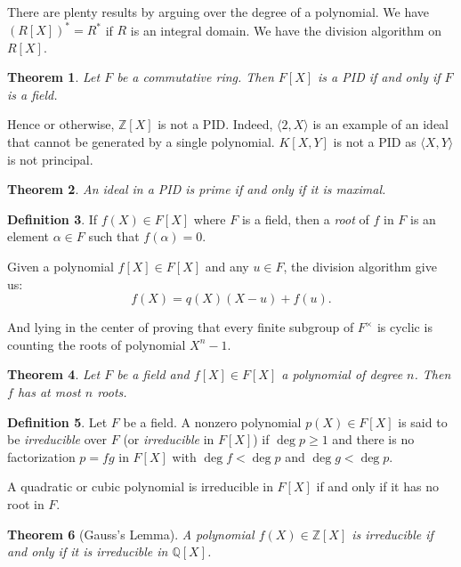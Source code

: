 \documentclass[12pt]{report}
\newtheorem{theorem}{Theorem}[section]
\theoremstyle{definition}
\newtheorem{definition}[theorem]{Definition}
\newcommand{\ZZ}{\mathbb{Z}}
\newcommand{\QQ}{\mathbb{Q}}
\begin{document}
There are plenty results by arguing over the degree of a polynomial. We have $(R[X])^* =  R^*$ if $R$ is an integral domain. We have the division algorithm on $R[X]$.

\begin{theorem}
	Let $F$ be a commutative ring. Then $F[X]$ is a PID if and only if $F$ is a field.
\end{theorem}

Hence or otherwise, $\ZZ[X]$ is not a PID. Indeed, $\langle 2, X\rangle$ is an example of an ideal that cannot be generated by a single polynomial. $K[X,Y]$ is not a PID as $\langle X, Y \rangle$ is not principal.

\begin{theorem}
	An ideal in a PID is prime if and only if it is maximal.
\end{theorem}

\smallskip

\begin{definition}
	If $f(X)\in F[X]$ where $F$ is a field, then a \emph{root} of $f$ in $F$ is an element $\alpha\in F$ such that $f(\alpha)=0$.
\end{definition}

Given a polynomial $f[X]\in F[X]$ and any $u\in F$, the division algorithm give us: $$f(X)= q(X)(X-u)+f(u).$$

And lying in the center of proving that every finite subgroup of $F^\times$ is cyclic is counting the roots of polynomial $X^n-1$.

\begin{theorem}
	Let $F$ be a field and $f[X]\in F[X]$ a polynomial of degree $n$. Then $f$ has at most $n$ roots.
\end{theorem}

\begin{definition}
	Let $F$ be a field. A nonzero polynomial $p(X) \in F[X]$ is said to be \emph{irreducible} over $F$ (or \emph{irreducible} in $F[X]$) if $\deg p \geq 1$ and there is no factorization $p=fg$ in $F[X]$ with $\deg f < \deg p$ and $\deg g < \deg p$.
\end{definition}

A quadratic or cubic polynomial is irreducible in $F[X]$ if and only if it has no root in $F$.

\begin{theorem}[Gauss's Lemma]
	A polynomial $f(X)\in \ZZ[X]$ is irreducible if and only if it is irreducible in $\QQ[X]$.
\end{theorem}
\end{document}
